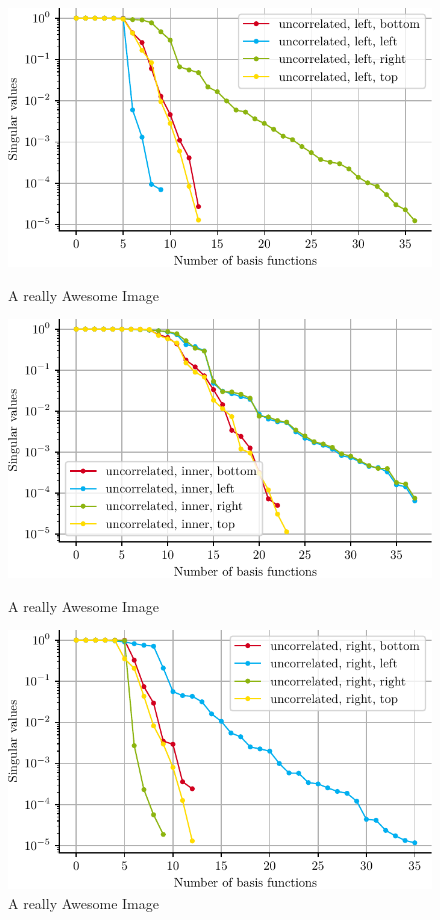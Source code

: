 \documentclass[a4paper]{eccomas_paper-2024}
\begin{document}
\begin{figure}[!htb]
  \includegraphics[width=\linewidth]{../figures/beam/fig_loc_svals_left.pdf}
  \caption{A really Awesome Image}\label{fig:loc_svals_left}
\endminipage\hfill
{}
  \includegraphics[width=\linewidth]{../figures/beam/fig_loc_svals_inner.pdf}
  \caption{A really Awesome Image}\label{fig:loc_svals_inner}
\endminipage\hfill
{}%
  \includegraphics[width=\linewidth]{../figures/beam/fig_loc_svals_right.pdf}
  \caption{A really Awesome Image}\label{fig:loc_svals_right}
\endminipage
\end{figure}
\end{document}
